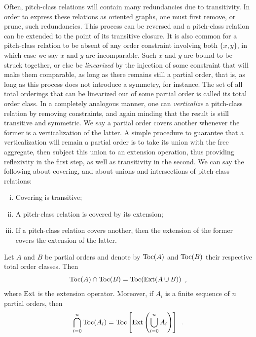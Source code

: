 Often, pitch-class relations will contain many redundancies due to transitivity. In order to express these relations as oriented graphs, one must first remove, or prune, such redundancies. This process can be reversed and a pitch-class relation can be extended to the point of its transitive closure. It is also common for a pitch-class relation to be absent of any order constraint involving both $\{ x, y \}$, in which case we say $x$ and $y$ are incomparable. Such $x$ and $y$ are bound to be struck together, or else be \emph{linearized} by the injection of some constraint that will make them comparable, as long as there remains still a partial order, that is, as long as this process does not introduce a symmetry, for instance. The set of all total orderings that can be linearized out of some partial order is called its total order class. In a completely analogous manner, one can \emph{verticalize} a pitch-class relation by removing constraints, and again minding that the result is still transitive and symmetric. We say a partial order covers another whenever the former is a verticalization of the latter. A simple procedure to guarantee that a verticalization will remain a partial order is to take its union with the free aggregate, then subject this union to an extension operation, thus providing reflexivity in the first step, as well as transitivity in the second. We can say the following about covering, and about unions and intersections of pitch-class relations:

\begin{theorem}
    \cite[193]{Starr1984}
    \begin{enumerate}[i.]
        \item Covering is transitive;
        \item A pitch-class relation is covered by its extension;
        \item If a pitch-class relation covers another, then the extension of the former covers the extension of the latter.
    \end{enumerate}
\end{theorem}

\begin{theorem}
    \cite[194]{Starr1984}
    \label{starr-theorem}
    Let $A$ and $B$ be partial orders and denote by $\operatorname{Toc}(A)$ and $\operatorname{Toc}(B)$ their respective total order classes. Then
    \begin{equation}
        \operatorname{Toc}(A) \cap \operatorname{Toc}(B) = \operatorname{Toc}(\operatorname{Ext}(A \cup B)) \enspace,
    \end{equation}
    where $\operatorname{Ext}$ is the extension operator. Moreover, if $A_i$ is a finite sequence of $n$ partial orders, then
    \begin{equation}
        \bigcap_{i = 0}^{n} \operatorname{Toc}(A_i) = \operatorname{Toc} \left[ \operatorname{Ext}\left ( \bigcup_{i = 0}^{n} A_i \right) \right] \enspace.
    \end{equation}
\end{theorem}

